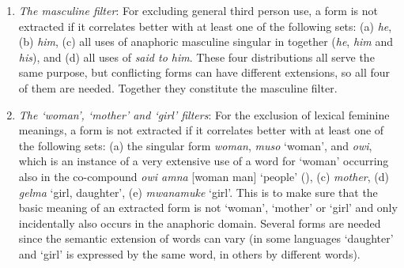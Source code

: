 \documentclass[output=collectionpaper]{langsci/langscibook}
\begin{document}
\begin{enumerate}[label=(\roman*)]
\item \emph{The masculine filter}: For excluding general third person use, a form is not extracted if it correlates better with at least one of the following sets: (a)  \textit{he}, (b)  \textit{him}, (c) all uses of anaphoric masculine singular in  together (\textit{he}, \textit{him} and \textit{his}), and (d) all uses of \textit{said to him}. These four distributions all serve the same purpose, but conflicting forms can have different extensions, so all four of them are needed. Together they constitute the masculine filter.
\item \emph{The ‘woman’, ‘mother’ and ‘girl’ filters}: For the exclusion of lexical feminine meanings, a form is not extracted if it correlates better with at least one of the following sets: (a) the  singular form \textit{woman},  \textit{muso} ‘woman’, and  \textit{owi}, which is an instance of a very extensive use of a word for ‘woman’ occurring also in the co-compound \textit{owi amna} [woman man] ‘people’ (\citealt[104]{Sarvasy2014}), (c)  \textit{mother}, (d)  \textit{gelma} ‘girl, daughter’, (e)  \textit{mwanamuke} ‘girl’. This is to make sure that the basic meaning of an extracted form is not ‘woman’, ‘mother’ or ‘girl’ and only incidentally also occurs in the anaphoric domain. Several forms are needed since the semantic extension of words can vary (in some languages ‘daughter’ and ‘girl’ is expressed by the same word, in others by different words).
\end{enumerate}
\end{document}
